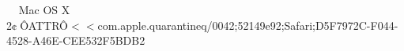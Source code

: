     Mac OS X            	   2   ¢      Ô                                      ATTR       Ô      <                     <  com.apple.quarantine q/0042;52149e92;Safari;D5F7972C-F044-4528-A46E-CEE532F5BDB2 